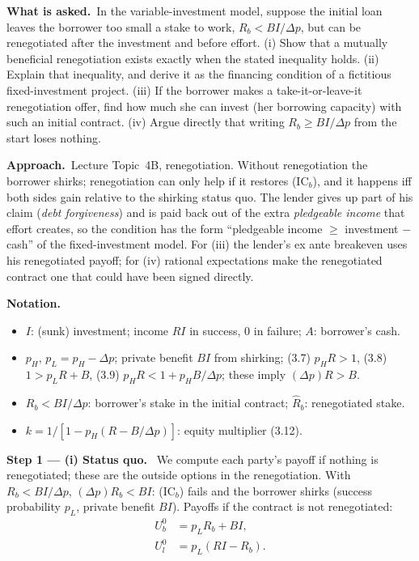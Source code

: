 \documentclass[11pt,a4paper]{article}
\newcommand{\notation}{\par\noindent\textbf{Notation.}}
\newcommand{\step}[2]{\par\medskip\noindent\textbf{Step #1 --- #2.}~}
\newcommand{\asked}{\par\medskip\noindent\textbf{What is asked.}~}
\newcommand{\approach}{\par\smallskip\noindent\textbf{Approach.}~}
\begin{document}
\asked In the variable-investment model, suppose the initial loan leaves the borrower too small a
stake to work, $R_b<BI/\Delta p$, but can be renegotiated after the investment and before effort.
(i) Show that a mutually beneficial renegotiation exists exactly when the stated inequality holds.
(ii) Explain that inequality, and derive it as the financing condition of a fictitious
fixed-investment project. (iii) If the borrower makes a take-it-or-leave-it renegotiation offer,
find how much she can invest (her borrowing capacity) with such an initial contract. (iv) Argue
directly that writing $R_b\ge BI/\Delta p$ from the start loses nothing.

\approach Lecture Topic~4B, renegotiation. Without renegotiation the borrower shirks; renegotiation
can only help if it restores (IC$_b$), and it happens iff both sides gain relative to the shirking
status quo. The lender gives up part of his claim (\emph{debt forgiveness}) and is paid back out of
the extra \emph{pledgeable income} that effort creates, so the condition has the form ``pledgeable
income $\ge$ investment $-$ cash'' of the fixed-investment model. For (iii) the lender's ex ante
breakeven uses his renegotiated payoff; for (iv) rational expectations make the renegotiated contract
one that could have been signed directly.

\notation
\begin{itemize}
  \item $I$: (sunk) investment; income $RI$ in success, $0$ in failure; $A$: borrower's cash.
  \item $p_H$, $p_L=p_H-\Delta p$; private benefit $BI$ from shirking; (3.7) $p_HR>1$, (3.8)
        $1>p_LR+B$, (3.9) $p_HR<1+p_HB/\Delta p$; these imply $(\Delta p)R>B$.
  \item $R_b<BI/\Delta p$: borrower's stake in the initial contract; $\hat R_b$: renegotiated stake.
  \item $k=1/[1-p_H(R-B/\Delta p)]$: equity multiplier (3.12).
\end{itemize}

\step{1}{(i) Status quo} We compute each party's payoff if nothing is renegotiated; these are the
outside options in the renegotiation. With $R_b<BI/\Delta p$, $(\Delta p)R_b<BI$: (IC$_b$) fails and
the borrower shirks (success probability $p_L$, private benefit $BI$). Payoffs if the contract is not
renegotiated:
\begin{align}
  U_b^0 &= p_LR_b+BI, \label{t4e12-ub0}\\
  U_l^0 &= p_L(RI-R_b). \label{t4e12-ul0}
\end{align}
\end{document}
